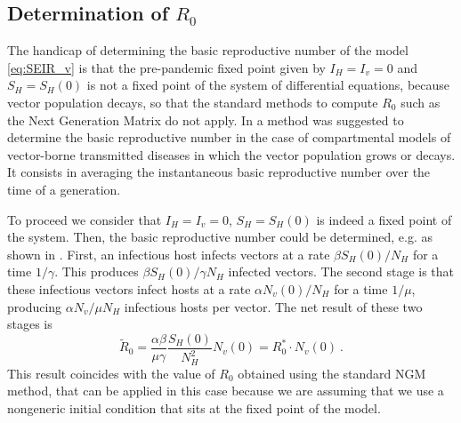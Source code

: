 \subsection{Determination of $R_0$}\label{app:R0}

The handicap of determining the basic reproductive number of the model
\cref{eq:SEIR_v} is that the pre-pandemic fixed point given by $I_H=I_v=0$ and
$S_H=S_H(0)$ is not a fixed point of the system of differential equations,
because vector population decays, so that the standard methods to compute $R_0$
such as the Next Generation Matrix \cite{Diekmann2010, GimenezRomero2022_PRE}
do not
apply. In \cite{GimenezRomero2022_PRE} a method was suggested to determine
the basic
reproductive number in the case of compartmental models of vector-borne
transmitted diseases in which the vector population grows or decays. It
consists in averaging the instantaneous basic reproductive number over the time
of a generation.

To proceed we consider that $I_H=I_v=0$, $S_H=S_H(0)$ is indeed a fixed
point of the system. Then, the basic reproductive number could be determined,
e.g. as shown in \cite{Brauer2016}. First, an infectious host infects vectors
at a rate $\beta S_H(0)/N_H$ for a time $1/\gamma$. This produces $\beta
    S_H(0)/\gamma N_H$ infected vectors. The second stage is that these
infectious
vectors infect hosts at a rate $\alpha N_v(0)/N_H$ for a time $1/\mu$,
producing $\alpha N_v/\mu N_H$ infectious hosts per vector. The net result of
these two stages is
\begin{equation}
    \tilde{R}_0=\frac{\alpha\beta}{\mu\gamma}
    \frac{S_H(0)}{N_H^2}N_v(0)=R_0^*
    \cdot
    N_v(0)\ .
    \label{eq:R0tilde}
\end{equation}
This result coincides with the value of $R_0$ obtained using the standard
NGM method, that can be applied in this case because we are assuming that we
use a nongeneric initial condition that sits at the fixed point of the model.

